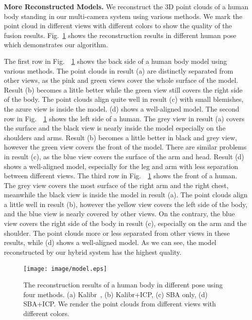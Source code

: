 \noindent \textbf{More Reconstructed Models.}
%
We reconstruct the 3D point clouds of a human body standing in our multi-camera system using various methods.  We mark the point cloud in different views with different colors to show the quality of the fusion results. Fig.~\ref{fig:model_poses} shows the reconstruction results in different human pose which demonstrates our algorithm. 

The first row in Fig.~~\ref{fig:model_poses} shows the back side of a human body model using various methods. The point clouds in result (a) are distinctly separated from other views, as the pink and green views cover the whole surface of the model. Result (b) becomes a little better while the green view still covers the right side of the body. The point clouds align quite well in result (c) with small blemishes, the azure view is inside the model. (d) shows a well-aligned model. 
The second row in Fig.~~\ref{fig:model_poses} shows the left side of a human. The grey view in result (a) covers the surface and the black view is nearly inside the model especially on the shoulders and arms. Result (b) becomes a little better in black and grey view, however the green view covers the front of the model. There are similar problems in result (c), as the blue view covers the surface of the arm and head. Result (d) shows a well-aligned model, especially for the leg and arm with less separation between different views. 
The third row in Fig.~~\ref{fig:model_poses} shows the front of a human. The grey view covers the most surface of the right arm and the right chest, meanwhile the black view is inside the model in result (a). The point clouds align a little well in result (b), however the yellow view covers the left side of the body, and the blue view is nearly covered by other views. On the contrary, the blue view covers the right side of the body in result (c), especially on the arm and the shoulder. The point clouds more or less separated from other views in these results, while (d) shows a well-aligned model.
As we can see, the model reconstructed by our hybrid system has the highest quality.
\begin{figure}[ht]
	\centering
	\texttt{[image: image/model.eps]}
	\caption{The reconstruction results of a human body in different pose using four methods. (a) Kalibr~\cite{Maye2013Self}, (b) Kalibr+ICP, (c) SBA only, (d) SBA+ICP. We render the point clouds from different views with different colors.}
	\label{fig:model_poses}
\end{figure}


